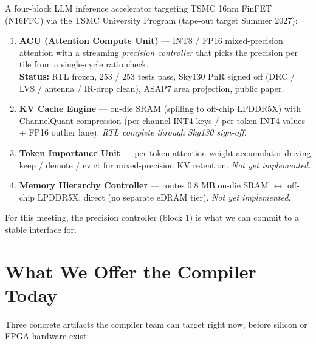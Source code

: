 \documentclass[11pt]{article}
\begin{document}
A four-block LLM inference accelerator targeting TSMC 16nm FinFET (N16FFC) via the TSMC
University Program (tape-out target Summer 2027):
\begin{enumerate}
\item \textbf{ACU (Attention Compute Unit)} --- INT8 / FP16 mixed-precision
  attention with a streaming \emph{precision controller} that picks the
  precision per tile from a single-cycle ratio check.\\
  \textbf{Status:} RTL frozen, 253 / 253 tests pass, Sky130 PnR signed off
  (DRC / LVS / antenna / IR-drop clean), ASAP7 area projection, public paper.
\item \textbf{KV Cache Engine} --- on-die SRAM (spilling to off-chip LPDDR5X) with
  ChannelQuant compression (per-channel INT4 keys / per-token INT4 values +
  FP16 outlier lane). \emph{RTL complete through Sky130 sign-off.}
\item \textbf{Token Importance Unit} --- per-token attention-weight
  accumulator driving keep / demote / evict for mixed-precision KV
  retention. \emph{Not yet implemented.}
\item \textbf{Memory Hierarchy Controller} --- routes 0.8 MB on-die SRAM
  $\leftrightarrow$ off-chip LPDDR5X, direct (no separate eDRAM tier).
  \emph{Not yet implemented.}
\end{enumerate}
For this meeting, the precision controller (block 1) is what we can commit
to a stable interface for.

\section{What We Offer the Compiler Today}
\label{sec:offer}

Three concrete artifacts the compiler team can target right now, before
silicon or FPGA hardware exist:
\end{document}
